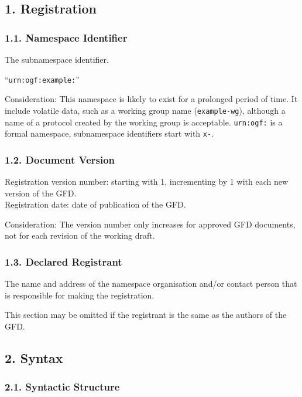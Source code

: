\documentclass[12pt]{article}  %
\begin{document}
\subsection*{1. Registration}

\subsubsection*{1.1. Namespace Identifier}

The subnamespace identifier.

\begin{example}
“\texttt{urn:ogf:example:}”
\end{example}

Consideration: This namespace is likely to exist for a prolonged period of
time. It \MUSTNOT{} include volatile data, such as a working group name
(\texttt{example-wg}), although a name of a protocol created by the working 
group is acceptable. 
\texttt{urn:ogf:} is a formal namespace, subnamespace identifiers \MUSTNOT{} 
start with \texttt{x-}.

\subsubsection*{1.2. Document Version}

Registration version number: starting with 1, incrementing by 1 with each new version of the GFD. \\
Registration date: date of publication of the GFD.

Consideration: The version number only increases for approved GFD documents, not for each revision of the working draft.

\subsubsection*{1.3. Declared Registrant}

The name and address of the namespace organisation and/or contact person that
is responsible for making the registration.

This section may be omitted if the registrant is the same as the authors of the GFD.

\subsection*{2. Syntax}

\subsubsection*{2.1. Syntactic Structure}
\end{document}
